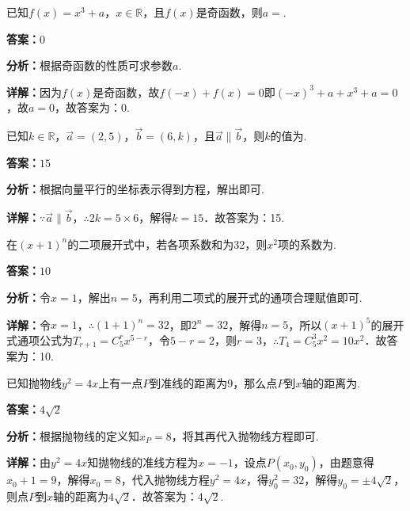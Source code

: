 \begin{question}[points=4]
已知$f(x)=x^3+a$，$x\in\mathbb{R}$，且$f(x)$是奇函数，则$a=$.
\fillin[{$0$}]
\begin{solution}
\textbf{答案：}$0$

\textbf{分析：}根据奇函数的性质可求参数$a$.

\textbf{详解：}因为$f(x)$是奇函数，故$f(-x)+f(x)=0$即$(-x)^3+a+x^3+a=0$，故$a=0$，故答案为：$0$.
\end{solution}
\end{question}

\begin{question}[points=4]
已知$k\in\mathbb{R}$，$\vec{a}=(2,5)$，$\vec{b}=(6,k)$，且$\vec{a}\parallel\vec{b}$，则$k$的值为.
\fillin[{$15$}]
\begin{solution}
\textbf{答案：}$15$

\textbf{分析：}根据向量平行的坐标表示得到方程，解出即可.

\textbf{详解：}$\because\vec{a}\parallel\vec{b}$，$\therefore 2k=5\times6$，解得$k=15$．故答案为：15.
\end{solution}
\end{question}

\begin{question}[points=4]
在$(x+1)^n$的二项展开式中，若各项系数和为32，则$x^2$项的系数为.
\fillin[{$10$}]
\begin{solution}
\textbf{答案：}$10$

\textbf{分析：}令$x=1$，解出$n=5$，再利用二项式的展开式的通项合理赋值即可.

\textbf{详解：}令$x=1$，$\therefore (1+1)^n=32$，即$2^n=32$，解得$n=5$，所以$(x+1)^5$的展开式通项公式为$T_{r+1}=C_5^r x^{5-r}$，令$5-r=2$，则$r=3$，$\therefore T_4=C_5^3 x^2=10x^2$．故答案为：10.
\end{solution}
\end{question}

\begin{question}[points=5]
已知抛物线$y^2=4x$上有一点$P$到准线的距离为9，那么点$P$到$x$轴的距离为.
\fillin[{$4\sqrt{2}$}]
\begin{solution}
\textbf{答案：}$4\sqrt{2}$

\textbf{分析：}根据抛物线的定义知$x_P=8$，将其再代入抛物线方程即可.

\textbf{详解：}由$y^2=4x$知抛物线的准线方程为$x=-1$，设点$P(x_0,y_0)$，由题意得$x_0+1=9$，解得$x_0=8$，代入抛物线方程$y^2=4x$，得$y_0^2=32$，解得$y_0=\pm4\sqrt{2}$，则点$P$到$x$轴的距离为$4\sqrt{2}$．故答案为：$4\sqrt{2}$.
\end{solution}
\end{question}

